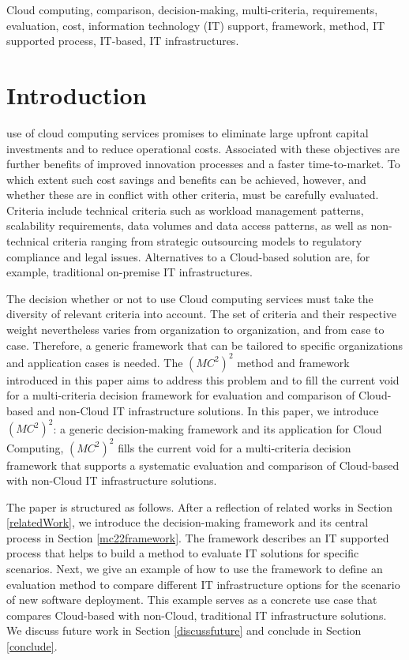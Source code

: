 \documentclass[journal,final,a4paper,twoside]{IEEEtran}
\begin{document}
\begin{IEEEkeywords}
Cloud computing, comparison, decision-making, multi-criteria, requirements, evaluation, cost, information technology (IT) support, framework, method, IT supported process, IT-based, IT infrastructures.
\end{IEEEkeywords}






\IEEEpeerreviewmaketitle



\section{Introduction}
 use of cloud computing services promises to eliminate large upfront capital investments and to reduce operational costs. Associated with these objectives are further benefits of improved innovation processes and a faster time-to-market. To which extent such cost savings and benefits can be achieved, however, and whether these are in conflict with other criteria, must be carefully evaluated. Criteria include technical criteria such as workload management patterns, scalability requirements, data volumes and data access patterns, as well as non-technical criteria ranging from strategic outsourcing models to regulatory compliance and legal issues. Alternatives to a Cloud-based solution are, for example, traditional on-premise IT infrastructures.

The decision whether or not to use Cloud computing services must take the diversity of relevant criteria into account. The set of criteria and their respective weight nevertheless varies from organization to organization, and from case to case. Therefore, a generic framework that can be tailored to specific organizations and application cases is needed.  The $(MC^2)^2$ method and framework introduced in this paper aims to address this problem and to fill the current void for a multi-criteria decision framework for evaluation and comparison of Cloud-based and non-Cloud IT infrastructure solutions.
In this paper, we introduce $(MC^2)^2$: a generic decision-making framework and its application for Cloud Computing, $(MC^2)^2$ fills the current void for a multi-criteria decision framework that supports a systematic evaluation and comparison of Cloud-based with non-Cloud IT infrastructure solutions.

The paper is structured as follows. After a reflection of related works in Section \ref{relatedWork}, we introduce the decision-making framework and its central process in Section \ref{mc22framework}. The framework describes an IT supported process that helps to build a method to evaluate IT solutions for specific scenarios. Next, we give an example of how to use the framework to define an evaluation method to compare different IT infrastructure options for the scenario of new software deployment. This example serves as a concrete use case that compares Cloud-based with non-Cloud, traditional IT infrastructure solutions. We discuss future work in Section \ref{discussfuture} and conclude in Section \ref{conclude}. 
\end{document}
